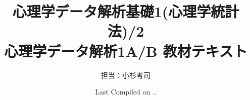 \documentclass{ltjsbook}
\begin{document}
\VerbatimFootnotes
\title{心理学データ解析基礎1(心理学統計法)/2\\心理学データ解析1A/B 教材テキスト}
\author{担当：小杉考司}
\date{Last Compiled on \number\year .\number\month .\number\day}
\maketitle
\setcounter{tocdepth}{1}
\tableofcontents
\linenumbers




















% 
% 
% 
% 
% 
% 
% 
% 
% 
% 
\nolinenumbers
{}


\printindex
\end{document}
